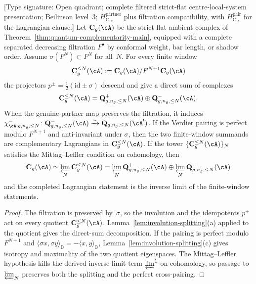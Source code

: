 \begin{lemma}
\label{lem:finite-window-complementarity}
\textup{[Type signature: Open quadrant; complete filtered strict-flat
centre-local-system presentation; Beilinson level~3;
\(H_{\mathrm C_{1a}}^{\mathrm{partner}}\) plus filtration compatibility,
with \(H_{\mathrm C_{1b}}^{\mathrm{pair}}\) for the Lagrangian clause.]}
Let $\mathbf{C}_g(\cA)$ be the strict flat ambient complex of
Theorem~\ref{thm:quantum-complementarity-main}, equipped with a
complete separated decreasing filtration $F^\bullet$ by conformal
weight, bar length, or shadow order. Assume $\sigma(F^N)\subset F^N$
for all~$N$. For every finite window
\[
  \mathbf{C}_g^{\leq N}(\cA)
  :=
  \mathbf{C}_g(\cA)/F^{N+1}\mathbf{C}_g(\cA)
\]
the projectors
$p^\pm=\tfrac12(\mathrm{id}\pm\sigma)$ descend and give a direct
sum of complexes
\[
  \mathbf{C}_g^{\leq N}(\cA)
  =
  \mathbf{Q}^{+}_{g,n_g,\leq N}(\cA)
  \oplus
  \mathbf{Q}^{-}_{g,n_g,\leq N}(\cA).
\]
When the genuine-partner map preserves the filtration, it induces
$\chi^-_{\cA;g,n_g,\leq N}\colon
\mathbf Q^-_{g,n_g,\leq N}(\cA)\xrightarrow{\sim}
\mathbf Q_{g,n_g,\leq N}(\cA^!)$.
If the Verdier pairing is perfect modulo $F^{N+1}$ and
anti-invariant under $\sigma$, then the two finite-window summands
are complementary Lagrangians in
$\mathbf{C}_g^{\leq N}(\cA)$. If the tower
$\{\mathbf{C}_g^{\leq N}(\cA)\}_N$ satisfies the Mittag--Leffler
condition on cohomology, then
\[
  \mathbf{C}_g(\cA)
  \simeq
  \varprojlim_N \mathbf{C}_g^{\leq N}(\cA)
  =
  \varprojlim_N \mathbf{Q}^{+}_{g,n_g,\leq N}(\cA)
  \oplus
  \varprojlim_N \mathbf{Q}^{-}_{g,n_g,\leq N}(\cA)
\]
and the completed Lagrangian statement is the inverse limit of the
finite-window statements.
\end{lemma}

\begin{proof}
The filtration is preserved by~$\sigma$, so the involution and the
idempotents $p^\pm$ act on every quotient
$\mathbf{C}_g^{\leq N}(\cA)$. Lemma~\ref{lem:involution-splitting}(a)
applied to the quotient gives the direct-sum decomposition. If the
pairing is perfect modulo $F^{N+1}$ and
$\langle\sigma x,\sigma y\rangle_{\mathbb{D}}
=-\langle x,y\rangle_{\mathbb{D}}$,
Lemma~\ref{lem:involution-splitting}(c) gives isotropy and maximality
of the two quotient eigenspaces. The
Mittag--Leffler hypothesis kills the derived inverse-limit term
$\varprojlim^1$ on cohomology, so passage to
$\varprojlim_N$ preserves both the splitting and the perfect
cross-pairing.
\end{proof}

